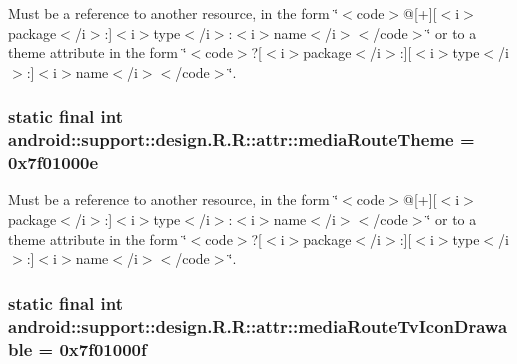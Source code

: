 Must be a reference to another resource, in the form \char`\"{}$<$code$>$@\mbox{[}+\mbox{]}\mbox{[}$<$i$>$package$<$/i$>$:\mbox{]}$<$i$>$type$<$/i$>$:$<$i$>$name$<$/i$>$$<$/code$>$\char`\"{} or to a theme attribute in the form \char`\"{}$<$code$>$?\mbox{[}$<$i$>$package$<$/i$>$:\mbox{]}\mbox{[}$<$i$>$type$<$/i$>$:\mbox{]}$<$i$>$name$<$/i$>$$<$/code$>$\char`\"{}. \hypertarget{classandroid_1_1support_1_1design_1_1_r_1_1attr_837c1d5b33515cee561a0d5fd2380ad5}{
\subsubsection[{mediaRouteTheme}]{\setlength{\rightskip}{0pt plus 5cm}static final int android::support::design.R.R::attr::mediaRouteTheme = 0x7f01000e}}
\label{classandroid_1_1support_1_1design_1_1_r_1_1attr_837c1d5b33515cee561a0d5fd2380ad5}


Must be a reference to another resource, in the form \char`\"{}$<$code$>$@\mbox{[}+\mbox{]}\mbox{[}$<$i$>$package$<$/i$>$:\mbox{]}$<$i$>$type$<$/i$>$:$<$i$>$name$<$/i$>$$<$/code$>$\char`\"{} or to a theme attribute in the form \char`\"{}$<$code$>$?\mbox{[}$<$i$>$package$<$/i$>$:\mbox{]}\mbox{[}$<$i$>$type$<$/i$>$:\mbox{]}$<$i$>$name$<$/i$>$$<$/code$>$\char`\"{}. \hypertarget{classandroid_1_1support_1_1design_1_1_r_1_1attr_98031086b836cb04cbb91e8771cc72ed}{
\subsubsection[{mediaRouteTvIconDrawable}]{\setlength{\rightskip}{0pt plus 5cm}static final int android::support::design.R.R::attr::mediaRouteTvIconDrawable = 0x7f01000f}}
\label{classandroid_1_1support_1_1design_1_1_r_1_1attr_98031086b836cb04cbb91e8771cc72ed}


